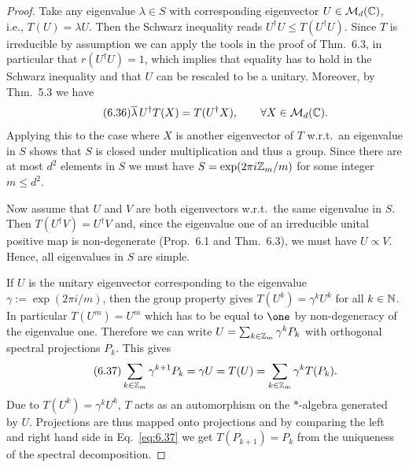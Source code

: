\documentclass[11pt,a4paper]{article}
\theoremstyle{plain}
\theoremstyle{definition}
\theoremstyle{remark}
\begin{document}
\begin{proof}
    Take any eigenvalue $\lambda\in S$ with corresponding eigenvector $U\in\mathcal{M}_d(\mathbb{C})$,
    i.e., $T(U)=\lambda U$. Then the Schwarz inequality reads $U^\dagger U\le T(U^\dagger U)$.
    Since $T$ is irreducible by assumption we can apply the tools in the proof of Thm.~6.3,
    in particular that $r(U^\dagger U)=1$, which implies that equality has to hold in the
    Schwarz inequality and that $U$ can be rescaled to be a unitary. Moreover, by Thm.~5.3 we have
    \begin{equation}\tag{6.36}\label{eq:6.36}
        \overline{\lambda}\,U^\dagger T(X)=T(U^\dagger X),
        \qquad \forall X\in\mathcal{M}_d(\mathbb{C}).
    \end{equation}
    Applying this to the case where $X$ is another eigenvector of $T$ w.r.t.\ an eigenvalue
    in $S$ shows that $S$ is closed under multiplication and thus a group. Since there are at
    most $d^2$ elements in $S$ we must have $S=\exp(2\pi i \mathbb{Z}_m/m)$ for some integer $m\le d^2$.

    Now assume that $U$ and $V$ are both eigenvectors w.r.t.\ the same eigenvalue in $S$.
    Then $T(U^\dagger V)=U^\dagger V$ and, since the eigenvalue one of an irreducible unital
    positive map is non-degenerate (Prop.~6.1 and Thm.~6.3), we must have $U\propto V$.
    Hence, all eigenvalues in $S$ are simple.

    If $U$ is the unitary eigenvector corresponding to the eigenvalue $\gamma:=\exp(2\pi i/m)$,
    then the group property gives $T(U^k)=\gamma^k U^k$ for all $k\in\mathbb{N}$. In particular
    $T(U^m)=U^m$ which has to be equal to $\one$ by non-degeneracy of the eigenvalue one.
    Therefore we can write $U=\sum_{k\in\mathbb{Z}_m}\gamma^k P_k$ with orthogonal spectral projections
    $P_k$. This gives
    \begin{equation}\tag{6.37}\label{eq:6.37}
        \sum_{k\in\mathbb{Z}_m}\gamma^{k+1}P_k = \gamma U = T(U) = \sum_{k\in\mathbb{Z}_m}\gamma^k T(P_k).
    \end{equation}
    Due to $T(U^k)=\gamma^kU^k$, $T$ acts as an automorphism on the $*$-algebra generated by
    $U$. Projections are thus mapped onto projections and by comparing the left and right hand
    side in Eq.~\eqref{eq:6.37} we get $T(P_{k+1})=P_k$ from the uniqueness of the spectral decomposition.
\end{proof}
\end{document}
